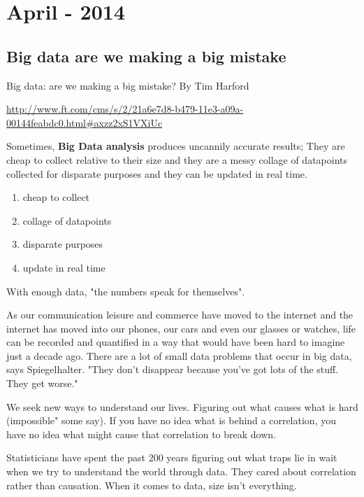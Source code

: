 
\chapter[April - 2014]{April - 2014} %

\label{ch:apr:2014} %

\section{Big data  are we making a big mistake}

Big data: are we making a big mistake?
By Tim Harford

\url{http://www.ft.com/cms/s/2/21a6e7d8-b479-11e3-a09a-00144feabdc0.html#axzz2xS1VXiUc}

Sometimes, {\bf Big Data analysis} produces uncannily accurate results; They are cheap to collect relative to their size and they are a messy collage of datapoints collected for disparate purposes and
they can be updated in real time. 

\begin{enumerate}
\item cheap to collect
\item collage of datapoints
\item disparate purposes
\item update in real time
\end{enumerate}

With enough data, "the numbers speak for themselves".

As our communication leisure and commerce have moved to the internet and the internet has moved into our phones, our cars and even our glasses or watches,  life can be recorded and quantified in a way that would have been hard to imagine just a decade ago.
There are a lot of small data problems that occur in big data, says Spiegelhalter.  "They don't disappear because you've got lots of the stuff. They get worse."


We seek new ways to understand our lives.
Figuring out what causes what is hard (impossible" some say).
If you have no idea what is behind a correlation, you have no idea what might cause that correlation to break down. 

Statisticians have spent the past 200 years figuring out what traps lie in wait when we try to understand the world through data. 
They cared  about correlation rather than causation.
When it comes to data, size isn't everything.

